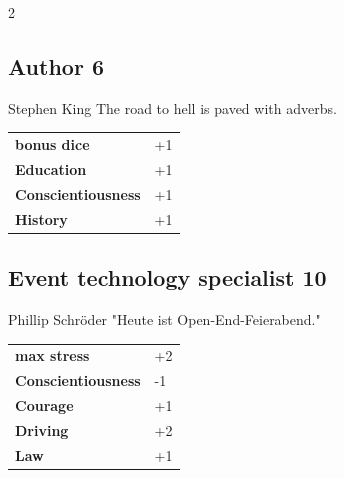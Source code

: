 \begin{multicols}{2}
\begin{tcolorbox}
    \subsection*{Author \hfill \small{6 }}
    \tcblower


\begin{pquote}{Stephen King}
The road to hell is paved with adverbs.
\end{pquote}

\vspace{3mm}

\begin{tabular}{@{}ll@{}}
    \textbf{bonus dice} & +1\\
    \textbf{Education} & +1\\
    \textbf{Conscientiousness} & +1\\
    \textbf{History} & +1\\
\end{tabular}


\end{tcolorbox}

\begin{tcolorbox}
    \subsection*{Event technology specialist \hfill \small{10 }}
    \tcblower


\begin{pquote}{Phillip Schröder}
"Heute ist Open-End-Feierabend."
\end{pquote}

\vspace{3mm}

\begin{tabular}{@{}ll@{}}
    \textbf{max stress} & +2\\
    \textbf{Conscientiousness} & -1\\
    \textbf{Courage} & +1\\
    \textbf{Driving} & +2\\
    \textbf{Law} & +1\\
\end{tabular}


\end{tcolorbox}
\end{multicols}
